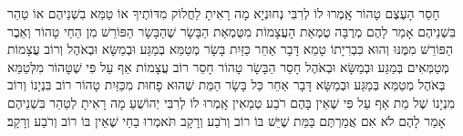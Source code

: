{חָסֵר הָעֶצֶם טָהוֹר\hdot
אָֽמְרוּ לוֹ לְרִבִּי נְחוּנְיָא מָה רָאִיתָ לַחֲלוֹק מִדּוֹתֶיךָ\hdot
אוֹ טַמֵּא בִשְׁנֵיהֶם\hdot
אוֹ טַהֵר בִּשְׁנֵיהֶם\hdot
אָמַר לָהֶם מְרֻבָּה טֻמְאַת הָעֲצָמוֹת מִטֻּמְאַת הַבָּשָׂר\hdot
שֶׁהַבָּשָׂר הַפּוֹרֵשׁ מִן הַחַי טָהוֹר\hdot
וְאֵבֶר הַפּוֹרֵשׁ מִמֶּנּוּ וְהוּא כִּבְרִיָתוֹ טָמֵא\hdot
דָּבָר אַחֵר כַּזַּיִת בָּשָׂר מְטַמֵּא בְּמַגַּע וּבְמַשָּׂא וּבְאֹהֶל\hdot
וְרוֹב עֲצָמוֹת מְטַמְּאִים בְּמַגַּע וּבְמַשָּׂא וּבְאֹהֶל\hdot
חָסֵר הַבָּשָׂר טָהוֹר\hdot
חָסֵר רוֹב עֲצָמוֹת\hdot
אַף עַל פִּי שֶׁטָּהוֹר מִלְּטַמֵּא בְּאֹהֶל\hdot
מְטַמֵּא בְּמַגַּע וּבְמַשָּׂא\hdot
דָּבָר אַחֵר כַּל בָּשָׂר הַמֵּת שֶׁהוּא פָחוּת מִכַּזַּיִת טָהוֹר\hdot
רוֹב בִּנְיָנוֹ וְרוֹב מִנְיָנוֹ שֶׁל מֵת\hdot
אַף עַל פִּי שֶׁאֵין בָּהֶם רֹבַע טְמֵאִין\hdot
אָֽמְרוּ לוֹ לְרִבִּי יְהוֹשֻׁעַ מָה רָאִיתָ לְטַהֵר בִּשְׁנֵיהֶם\hdot
אָמַר לָהֶם לֹא\hdot
אִם אֲמַרְתֶּם\hdot
בַּמֵּת שֶׁיֵּשׁ בּוֹ רוֹב וְרֹבַע וְרָקָב\hdot
תֹּאמְרוּ בַחַי שֶׁאֵין בּוֹ רוֹב וְרֹבַע וְרָקָב׃}
